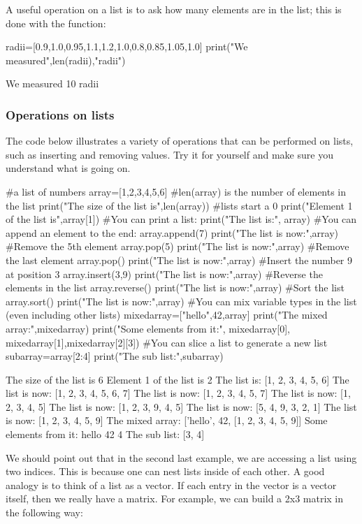 A useful operation on a list is to ask how many elements are in the list; this is done with the  function:
\begin{python}[caption = Length of a list]
radii=[0.9,1.0,0.95,1.1,1.2,1.0,0.8,0.85,1.05,1.0]
print("We measured",len(radii),"radii")
\end{python}
\begin{poutput}
We measured 10 radii
\end{poutput}

\subsubsection{Operations on lists}
The code below illustrates a variety of operations that can be performed on lists, such as inserting and removing values. Try it for yourself and make sure you understand what is going on.
\begin{python}[caption = Operations on lists]
#a list of numbers
array=[1,2,3,4,5,6]
#len(array) is the number of elements in the list
print("The size of the list is",len(array))
#lists start a 0
print("Element 1 of the list is",array[1])
#You can print a list:
print("The list is:", array)
#You can append an element to the end:
array.append(7)
print("The list is now:",array)
#Remove the 5th element
array.pop(5)
print("The list is now:",array)
#Remove the last element
array.pop()
print("The list is now:",array)
#Insert the number 9 at position 3
array.insert(3,9)
print("The list is now:",array)
#Reverse the elements in the list
array.reverse()
print("The list is now:",array)
#Sort the list
array.sort()
print("The list is now:",array)
#You can mix variable types in the list (even including other lists)
mixedarray=["hello",42,array]
print("The mixed array:",mixedarray)
print("Some elements from it:", mixedarray[0],
      mixedarray[1],mixedarray[2][3])
#You can slice a list to generate a new list
subarray=array[2:4]
print("The sub list:",subarray)
\end{python}
\begin{poutput}
The size of the list is 6
Element 1 of the list is 2
The list is: [1, 2, 3, 4, 5, 6]
The list is now: [1, 2, 3, 4, 5, 6, 7]
The list is now: [1, 2, 3, 4, 5, 7]
The list is now: [1, 2, 3, 4, 5]
The list is now: [1, 2, 3, 9, 4, 5]
The list is now: [5, 4, 9, 3, 2, 1]
The list is now: [1, 2, 3, 4, 5, 9]
The mixed array: ['hello', 42, [1, 2, 3, 4, 5, 9]]
Some elements from it: hello 42 4
The sub list: [3, 4]
\end{poutput}
We should point out that in the second last example, we are accessing a list using two indices. This is because one can nest lists inside of each other. A good analogy is to think of a list as a vector. If each entry in the vector is a vector itself, then we really have a matrix. For example, we can build a 2x3 matrix in the following way:
